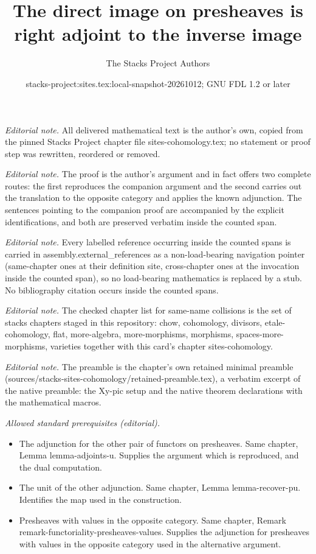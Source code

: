 \documentclass[10pt,a4paper]{amsart}
\title{The direct image on presheaves is right adjoint to the inverse image}
\author{The Stacks Project Authors}
\date{stacks-project:sites.tex:local-snapshot-20261012; GNU FDL 1.2 or later}
\theoremstyle{plain}
\theoremstyle{definition}
\theoremstyle{remark}
\numberwithin{equation}{subsection}
\begin{document}
\maketitle
\noindent\textit{Editorial note.} All delivered mathematical text is the author's own, copied from the pinned Stacks Project chapter file sites-cohomology.tex; no statement or proof step was rewritten, reordered or removed.\par\medskip
\noindent\textit{Editorial note.} The proof is the author's argument and in fact offers two complete routes: the first reproduces the companion argument and the second carries out the translation to the opposite category and applies the known adjunction. The sentences pointing to the companion proof are accompanied by the explicit identifications, and both are preserved verbatim inside the counted span.\par\medskip
\noindent\textit{Editorial note.} Every labelled reference occurring inside the counted spans is carried in assembly.external\_references as a non-load-bearing navigation pointer (same-chapter ones at their definition site, cross-chapter ones at the invocation inside the counted span), so no load-bearing mathematics is replaced by a stub. No bibliography citation occurs inside the counted spans.\par\medskip
\noindent\textit{Editorial note.} The checked chapter list for same-name collisions is the set of stacks chapters staged in this repository: chow, cohomology, divisors, etale-cohomology, flat, more-algebra, more-morphisms, morphisms, spaces-more-morphisms, varieties together with this card's chapter sites-cohomology.\par\medskip
\noindent\textit{Editorial note.} The preamble is the chapter's own retained minimal preamble (sources/stacks-sites-cohomology/retained-preamble.tex), a verbatim excerpt of the native preamble: the Xy-pic setup and the native theorem declarations with the mathematical macros.\par\medskip
\noindent\textit{Allowed standard prerequisites (editorial).}\begin{itemize}
\item The adjunction for the other pair of functors on presheaves. Same chapter, Lemma lemma-adjoints-u. Supplies the argument which is reproduced, and the dual computation.
\item The unit of the other adjunction. Same chapter, Lemma lemma-recover-pu. Identifies the map used in the construction.
\item Presheaves with values in the opposite category. Same chapter, Remark remark-functoriality-presheaves-values. Supplies the adjunction for presheaves with values in the opposite category used in the alternative argument.
\end{itemize}\medskip
\end{document}
